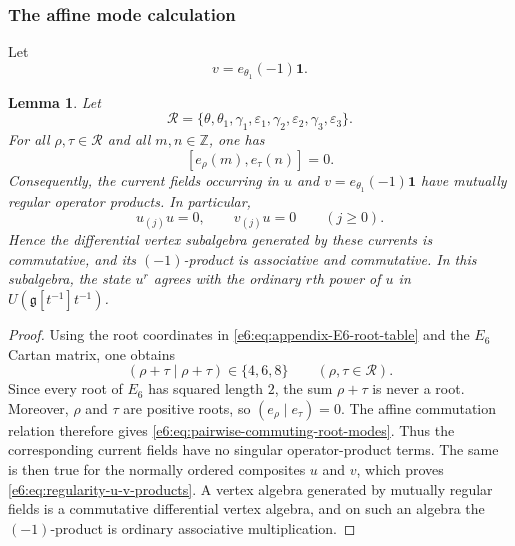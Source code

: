 \documentclass[11pt,reqno]{amsart}
\newtheorem{lemma}[theorem]{Lemma}
\theoremstyle{definition}
\theoremstyle{remark}
\begin{document}
\subsubsection{The affine mode calculation}
\label{e6:app:affine-mode-calculation}

Let
\begin{equation*}
  v=e_{\theta_1}(-1)\mathbf1.
\end{equation*}

\begin{lemma}\label{e6:lem:regularity-u-v}
Let
\[
  \mathcal R
  =\{\theta,\theta_1,\gamma_1,\varepsilon_1,
      \gamma_2,\varepsilon_2,\gamma_3,\varepsilon_3\}.
\]
For all $\rho,\tau\in\mathcal R$ and all $m,n\in\mathbb Z$, one has
\begin{equation}\label{e6:eq:pairwise-commuting-root-modes}
  [e_\rho(m),e_\tau(n)]=0.
\end{equation}
Consequently, the current fields occurring in $u$ and
$v=e_{\theta_1}(-1)\mathbf1$ have mutually regular operator products.  In
particular,
\begin{equation}\label{e6:eq:regularity-u-v-products}
  u_{(j)}u=0,
  \qquad
  v_{(j)}u=0
  \qquad(j\geq0).
\end{equation}
Hence the differential vertex subalgebra generated by these currents is
commutative, and its $(-1)$-product is associative and commutative.  In this
subalgebra, the state $u^r$ agrees with the ordinary $r$th power of $u$ in
$U(\mathfrak g[t^{-1}]t^{-1})$.
\end{lemma}

\begin{proof}
Using the root coordinates in \eqref{e6:eq:appendix-E6-root-table} and the
$E_6$ Cartan matrix, one obtains
\begin{equation*}
  (\rho+\tau\mid\rho+\tau)\in\{4,6,8\}
  \qquad(\rho,\tau\in\mathcal R).
\end{equation*}
Since every root of $E_6$ has squared length $2$, the sum $\rho+\tau$ is
never a root.  Moreover, $\rho$ and $\tau$ are positive roots, so
$(e_\rho\mid e_\tau)=0$.  The affine commutation relation therefore gives
\eqref{e6:eq:pairwise-commuting-root-modes}.  Thus the corresponding current
fields have no singular operator-product terms.  The same is then true for
the normally ordered composites $u$ and $v$, which proves
\eqref{e6:eq:regularity-u-v-products}.  A vertex algebra generated by mutually
regular fields is a commutative differential vertex algebra, and on such an
algebra the $(-1)$-product is ordinary associative multiplication.
\end{proof}
\end{document}
